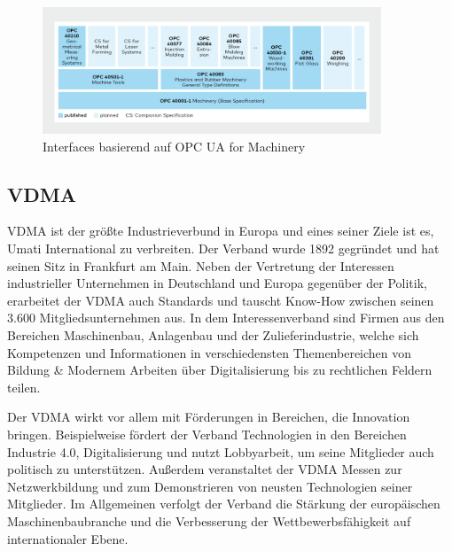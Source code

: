 \documentclass[a4paper, 12pt, oneside, toc=listofnumbered, bibliography=totoc]{scrbook}
\begin{document}
		\begin{figure}[H]
			\centering
			\includegraphics[width=0.9\textwidth]{res/diagramms/OPCUA_for_machinery.png}
			\caption{Interfaces basierend auf OPC UA for Machinery \cite{noauthor_machinery_nodate}} 
			\label{fig:OPCUA_for_machinery}
		\end{figure}
		
		
		\subsection{VDMA}
		
		\ac{VDMA} ist der größte Industrieverbund in Europa und eines seiner Ziele ist es, \ac{Umati} International zu verbreiten. Der Verband wurde 1892 gegründet und hat seinen Sitz in Frankfurt am Main. Neben der Vertretung der Interessen industrieller Unternehmen in Deutschland und Europa gegenüber der Politik, erarbeitet der VDMA auch Standards und tauscht Know-How zwischen seinen 3.600 Mitgliedsunternehmen aus. \cite{noauthor_verband_nodate} In dem Interessenverband sind Firmen aus den Bereichen Maschinenbau, Anlagenbau und der Zulieferindustrie, welche sich Kompetenzen und Informationen in verschiedensten Themenbereichen von Bildung \& Modernem Arbeiten über Digitalisierung bis zu rechtlichen Feldern teilen. \cite{noauthor_themenubersicht_nodate}
		
		Der VDMA wirkt vor allem mit Förderungen in Bereichen, die Innovation bringen. Beispielweise fördert der Verband Technologien in den Bereichen Industrie 4.0, Digitalisierung und nutzt Lobbyarbeit, um seine Mitglieder auch politisch zu unterstützen. Außerdem veranstaltet der VDMA Messen zur Netzwerkbildung und zum Demonstrieren von neusten Technologien seiner Mitglieder. Im Allgemeinen verfolgt der Verband die Stärkung der europäischen Maschinenbaubranche und die Verbesserung der Wettbewerbsfähigkeit auf internationaler Ebene. \cite{noauthor_themenubersicht_nodate}
		
\end{document}

